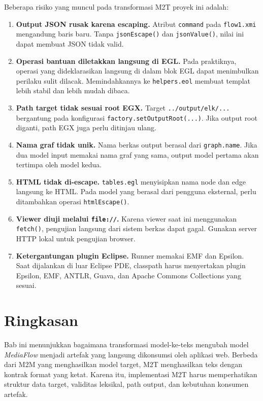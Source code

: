 Beberapa risiko yang muncul pada transformasi M2T proyek ini adalah:
\begin{enumerate}
  \item \textbf{Output JSON rusak karena escaping.} Atribut \texttt{command} pada \texttt{flow1.xmi} mengandung baris baru. Tanpa \texttt{jsonEscape()} dan \texttt{jsonValue()}, nilai ini dapat membuat JSON tidak valid.

  \item \textbf{Operasi bantuan diletakkan langsung di EGL.} Pada praktiknya, operasi yang dideklarasikan langsung di dalam blok EGL dapat menimbulkan perilaku sulit dilacak. Memindahkannya ke \texttt{helpers.eol} membuat templat lebih stabil dan lebih mudah dibaca.

  \item \textbf{Path target tidak sesuai root EGX.} Target \texttt{../output/elk/...} bergantung pada konfigurasi \texttt{factory.setOutputRoot(...)}. Jika output root diganti, path EGX juga perlu ditinjau ulang.

  \item \textbf{Nama graf tidak unik.} Nama berkas output berasal dari \texttt{graph.name}. Jika dua model input memakai nama graf yang sama, output model pertama akan tertimpa oleh model kedua.

  \item \textbf{HTML tidak di-escape.} \texttt{tables.egl} menyisipkan nama node dan edge langsung ke HTML. Pada model yang berasal dari pengguna eksternal, perlu ditambahkan operasi \texttt{htmlEscape()}.

  \item \textbf{Viewer diuji melalui \texttt{file://}.} Karena viewer saat ini menggunakan \texttt{fetch()}, pengujian langsung dari sistem berkas dapat gagal. Gunakan server HTTP lokal untuk pengujian browser.

  \item \textbf{Ketergantungan plugin Eclipse.} Runner memakai EMF dan Epsilon. Saat dijalankan di luar Eclipse PDE, classpath harus menyertakan plugin Epsilon, EMF, ANTLR, Guava, dan Apache Commons Collections yang sesuai.
\end{enumerate}

\section{Ringkasan}

Bab ini menunjukkan bagaimana transformasi model-ke-teks mengubah model \textit{MediaFlow} menjadi artefak yang langsung dikonsumsi oleh aplikasi web. Berbeda dari M2M yang menghasilkan model target, M2T menghasilkan teks dengan kontrak format yang ketat. Karena itu, implementasi M2T harus memperhatikan struktur data target, validitas leksikal, path output, dan kebutuhan konsumen artefak.

